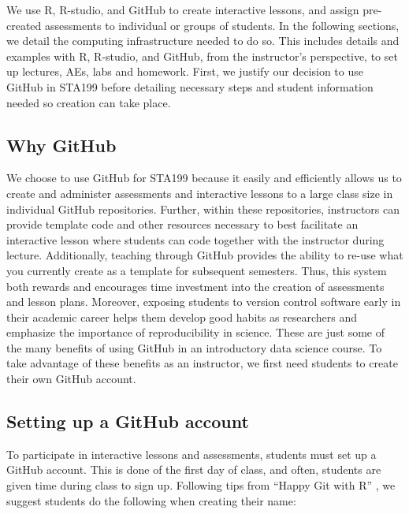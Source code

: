 \documentclass[
  12pt]{article}
\begin{document}
We use R, R-studio, and GitHub to create interactive lessons, and assign
pre-created assessments to individual or groups of students. In the
following sections, we detail the computing infrastructure needed to do
so. This includes details and examples with R, R-studio, and GitHub,
from the instructor's perspective, to set up lectures, AEs, labs and
homework. First, we justify our decision to use GitHub in STA199 before
detailing necessary steps and student information needed so creation can
take place.

\hypertarget{why-github}{%
\subsection{Why GitHub}\label{why-github}}

We choose to use GitHub for STA199 because it easily and efficiently
allows us to create and administer assessments and interactive lessons
to a large class size in individual GitHub repositories. Further, within
these repositories, instructors can provide template code and other
resources necessary to best facilitate an interactive lesson where
students can code together with the instructor during lecture.
Additionally, teaching through GitHub provides the ability to re-use
what you currently create as a template for subsequent semesters. Thus,
this system both rewards and encourages time investment into the
creation of assessments and lesson plans. Moreover, exposing students to
version control software early in their academic career helps them
develop good habits as researchers and emphasize the importance of
reproducibility in science. These are just some of the many benefits of
using GitHub in an introductory data science course. To take advantage
of these benefits as an instructor, we first need students to create
their own GitHub account.

\hypertarget{setting-up-a-github-account}{%
\subsection{Setting up a GitHub
account}\label{setting-up-a-github-account}}

To participate in interactive lessons and assessments, students must set
up a GitHub account. This is done of the first day of class, and often,
students are given time during class to sign up. Following tips from
``Happy Git with R'' \citep{bryan_hester_2020}, we suggest students do
the following when creating their name:
\end{document}
